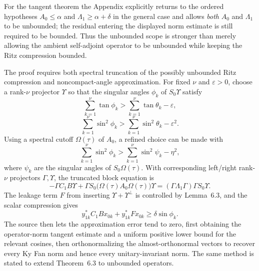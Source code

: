 For the tangent theorem the Appendix explicitly returns to the ordered hypotheses $A_0\le\alpha$ and $\Lambda_1\ge\alpha+\delta$ in the general case and allows \emph{both} $A_0$ and $\Lambda_1$ to be unbounded; the residual entering the displayed norm estimate is still required to be bounded.  Thus the unbounded scope is stronger than merely allowing the ambient self-adjoint operator to be unbounded while keeping the Ritz compression bounded.

The proof requires both spectral truncation of the possibly unbounded Ritz compression and noncompact-angle approximation.  For fixed $\nu$ and $\varepsilon>0$, choose a rank-$\nu$ projector $\Upsilon$ so that the singular angles $\phi_k$ of $S_0\Upsilon$ satisfy
\begin{equation}
 \sum_{k=1}^{\nu}\tan\phi_k
 >\sum_{k=1}^{\nu}\tan\theta_k-\varepsilon,
 \tag{6.7}
\end{equation}
\begin{equation}
 \sum_{k=1}^{\nu}\sin^2\phi_k
 >\sum_{k=1}^{\nu}\sin^2\theta_k-\varepsilon^2.
 \tag{6.8}
\end{equation}
Using a spectral cutoff $\Omega(\tau)$ of $A_0$, a refined choice can be made with
\begin{equation}
 \sum_{k=1}^{\nu}\sin^2\phi_k
 >\sum_{k=1}^{\nu}\sin^2\psi_k-\eta^2,
 \tag{6.9}
\end{equation}
where $\psi_k$ are the singular angles of $S_0\Omega(\tau)$.  With corresponding left/right rank-$\nu$ projectors $\Gamma,\Upsilon$, the truncated block equation is
\begin{equation}
 -\Gamma C_1B\Upsilon
 +\Gamma S_0\bigl(\Omega(\tau)A_0\Omega(\tau)\bigr)\Upsilon
 =(\Gamma\Lambda_1\Gamma)\Gamma S_0\Upsilon.
 \tag{6.10}
\end{equation}
The leakage term $F$ from inserting $\Upsilon+\Upsilon^\perp$ is controlled by Lemma~6.3, and the scalar compression gives
\begin{equation}
 y_{1k}^*C_1Bx_{0k}+y_{1k}^*Fx_{0k}
 \ge\delta\sin\phi_k.
 \tag{6.11}
\end{equation}
The source then lets the approximation error tend to zero, first obtaining the operator-norm tangent estimate and a uniform positive lower bound for the relevant cosines, then orthonormalizing the almost-orthonormal vectors to recover every Ky Fan norm and hence every unitary-invariant norm.  The same method is stated to extend Theorem~6.3 to unbounded operators.

